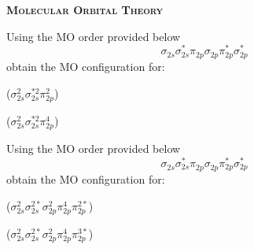 \documentclass[main.tex]{subfiles}
\begin{document}
\begin{multicols*}{2}
{\raggedright\textsc{\textbf{Molecular Orbital Theory}}\par}


\begin{question}[ID=\the\value{numA}]
Using the MO order provided below 
\[\sigma^{}_{2s}\sigma^{*}_{2s}\pi^{}_{2p}\sigma^{}_{2p}\pi^{*}_{2p}\sigma^{*}_{2p}\]
obtain the MO configuration for:
\begin{inparaenum}[(a)]
 \item {} %
 \item {} %
\end{inparaenum}
\end{question}
\begin{solution} 
 \begin{inparaenum}[(a)]
 \item {}  ($\sigma^{2}_{2s}\sigma^{*2}_{2s}\pi^{2}_{2p}$)
 \item {}  ($\sigma^{2}_{2s}\sigma^{*2}_{2s}\pi^{4}_{2p}$)
  \end{inparaenum}\hspace{0.1cm}\end{solution}
\begin{question}[ID=\the\value{numA}]
Using the MO order provided below 
\[\sigma^{}_{2s}\sigma^{*}_{2s}\pi^{}_{2p}\sigma^{}_{2p}\pi^{*}_{2p}\sigma^{*}_{2p}\]
obtain the MO configuration for:
\begin{inparaenum}[(a)]
 \item {}  %
 \item {}  %
\end{inparaenum}
\end{question}
\begin{solution} 
 \begin{inparaenum}[(a)]
 \item {}  ($\sigma^{2}_{2s}\sigma^{2*}_{2s} \sigma^{2}_{2p}\pi^{4}_{2p}\pi^{2*}_{2p}$)
 \item {}  ($\sigma^{2}_{2s}\sigma^{2*}_{2s} \sigma^{2}_{2p}\pi^{4}_{2p}\pi^{3*}_{2p}$)
 \end{inparaenum}\hspace{0.1cm}\end{solution}



\end{multicols*}
\end{document}
